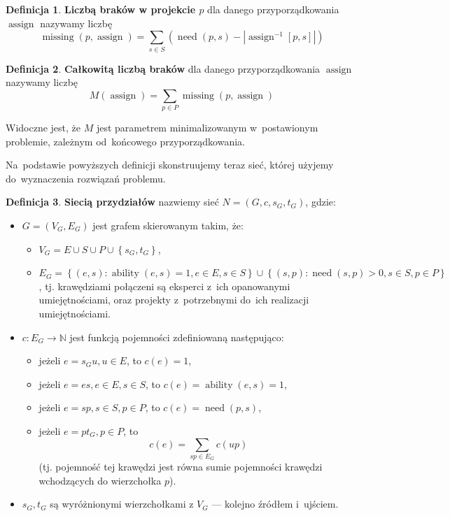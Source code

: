 \documentclass[12pt,a4paper]{article}
\theoremstyle{definition}
\newtheorem{defn}{Definicja}
\DeclareMathOperator{\ability}{ability}
\DeclareMathOperator{\need}{need}
\DeclareMathOperator{\assign}{assign}
\DeclareMathOperator{\missing}{missing}
\begin{document}
\begin{defn}
\textbf{Liczbą braków w projekcie $p$} dla danego przyporządkowania $\assign$
nazywamy liczbę
$$ \missing(p,\assign) = \sum_{s \in S} \left( \need(p,s) -
\left| \assign^{-1}[p,s] \right| \right) $$
\end{defn}

\begin{defn}
\textbf{Całkowitą liczbą braków} dla danego przyporządkowania $\assign$ nazywamy
liczbę
$$ M(\assign) = \sum_{p \in P} \missing(p, \assign) $$
\end{defn}

Widoczne jest, że $M$ jest parametrem minimalizowanym w~postawionym problemie,
zależnym od~końcowego przyporządkowania.

Na~podstawie powyższych definicji skonstruujemy teraz sieć, której użyjemy
do~wyznaczenia rozwiązań problemu.

\begin{defn}
\textbf{Siecią przydziałów} nazwiemy sieć $N = \left(G,c,s_G,t_G\right)$, gdzie:
\begin{itemize}
	\item $G = \left(V_G,E_G\right)$ jest grafem skierowanym takim, że:
	\begin{itemize}
		\item $V_G = E \cup S \cup P \cup \left\lbrace s_G,t_G \right\rbrace$,
		\item $E_G = \left\lbrace (e,s) : \ability(e,s) = 1, e \in E, s \in S
		\right\rbrace \cup \left\lbrace (s,p) : \need(s,p) > 0, s \in S, p \in P
		\right\rbrace$, tj. krawędziami połączeni są eksperci z~ich opanowanymi
		umiejętnościami, oraz projekty z~potrzebnymi do~ich realizacji
		umiejętnościami.
	\end{itemize}
	\item $c : E_G \to \mathbb{N}$ jest funkcją pojemności zdefiniowaną
	następująco:
	\begin{itemize}
		\item jeżeli $e = s_G u, u \in E$, to $c(e) = 1$,
		\item jeżeli $e = es, e \in E, s \in S$, to $c(e) = \ability(e,s) = 1$,
		\item jeżeli $e = sp, s \in S, p \in P$, to $c(e) = \need(p,s)$,
		\item jeżeli $e = pt_G, p \in P$, to
		$$c(e) = \sum_{sp \in E_G} c(up)$$
		(tj. pojemność tej krawędzi jest równa sumie pojemności krawędzi
		wchodzących do wierzchołka $p$).
	\end{itemize}
	\item $s_G,t_G$ są wyróżnionymi wierzchołkami z $V_G$ --- kolejno źródłem
	i~ujściem.
\end{itemize}
\end{defn}
\end{document}
